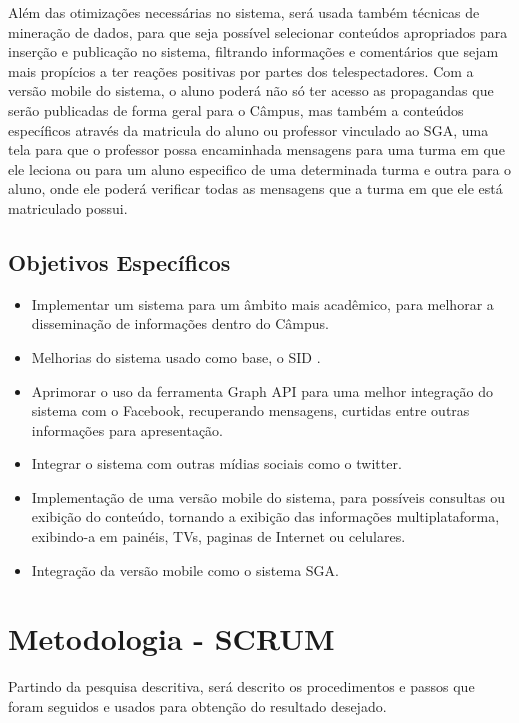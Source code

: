 Além das otimizações necessárias no sistema, será usada também técnicas de mineração
de dados, para que seja possível selecionar conteúdos apropriados para inserção
e publicação no sistema, filtrando informações e comentários que sejam mais propícios a
ter reações positivas por partes dos telespectadores. Com a versão mobile do sistema, o
aluno poderá não só ter acesso as propagandas que serão publicadas de forma geral para o
Câmpus, mas também a conteúdos específicos através da matricula do aluno ou professor
vinculado ao SGA, uma tela para que o professor possa encaminhada mensagens para
uma turma em que ele leciona ou para um aluno especifico de uma determinada turma e
outra para o aluno, onde ele poderá verificar todas as mensagens que a turma em que ele
está matriculado possui.



\subsection{Objetivos Específicos}
	 \begin{itemize}
	\item Implementar um sistema para um âmbito mais acadêmico, para melhorar a disseminação de informações dentro do Câmpus.
	 	
	\item Melhorias do sistema usado como base, o SID \cite{sobrinho2017}.
	
	\item Aprimorar o uso da ferramenta Graph API para uma melhor integração do sistema com o Facebook, recuperando mensagens, curtidas entre outras informações para apresentação.
	
	\item Integrar o sistema com outras mídias sociais como o twitter.
	
	\item Implementação de uma versão mobile do sistema, para possíveis consultas ou exibição do conteúdo, tornando a exibição das informações multiplataforma, exibindo-a em painéis, TVs, paginas de Internet ou celulares.
	
	\item  Integração da versão mobile como o sistema SGA.
	\end{itemize}
\section{Metodologia - SCRUM}
Partindo da pesquisa descritiva, será descrito os procedimentos e passos que foram seguidos e usados para obtenção do resultado desejado.
	
